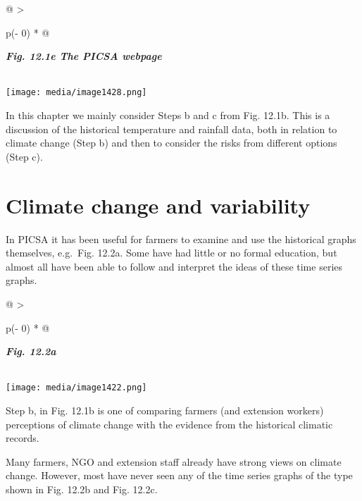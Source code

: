 \documentclass[
  letterpaper,
  DIV=11,
  numbers=noendperiod]{scrreprt}
\begin{document}
\begin{longtable}[]{@{}
  >{\raggedright\arraybackslash}p{(\columnwidth - 0\tabcolsep) * }@{}}
\toprule\noalign{}
\begin{minipage}[b]{\linewidth}\raggedright
\textbf{\emph{Fig. 12.1e The PICSA webpage}}
\end{minipage} \\
\midrule\noalign{}
\endhead
\bottomrule\noalign{}
\endlastfoot
\texttt{[image: media/image1428.png]} \\
\end{longtable}

In this chapter we mainly consider Steps b and c from Fig. 12.1b. This
is a discussion of the historical temperature and rainfall data, both in
relation to climate change (Step b) and then to consider the risks from
different options (Step c).

\section{Climate change and
variability}\label{climate-change-and-variability}

In PICSA it has been useful for farmers to examine and use the
historical graphs themselves, e.g.~Fig. 12.2a. Some have had little or
no formal education, but almost all have been able to follow and
interpret the ideas of these time series graphs.

\begin{longtable}[]{@{}
  >{\raggedright\arraybackslash}p{(\columnwidth - 0\tabcolsep) * }@{}}
\toprule\noalign{}
\begin{minipage}[b]{\linewidth}\raggedright
\textbf{\emph{Fig. 12.2a}}
\end{minipage} \\
\midrule\noalign{}
\endhead
\bottomrule\noalign{}
\endlastfoot
\texttt{[image: media/image1422.png]} \\
\end{longtable}

Step b, in Fig. 12.1b is one of comparing farmers (and extension
workers) perceptions of climate change with the evidence from the
historical climatic records.

Many farmers, NGO and extension staff already have strong views on
climate change. However, most have never seen any of the time series
graphs of the type shown in Fig. 12.2b and Fig. 12.2c.
\end{document}
